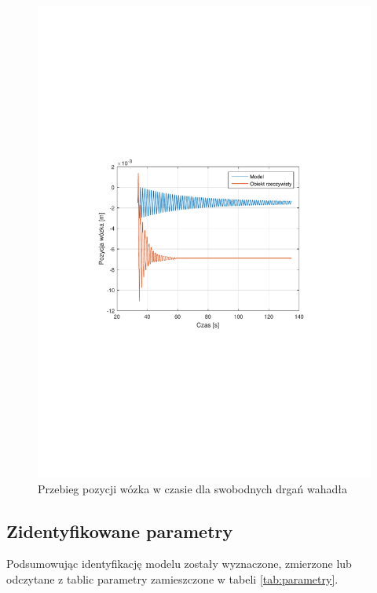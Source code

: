 \documentclass[12pt]{article}
\begin{document}
\begin{figure}[!htb]
    \begin{center}
        \includegraphics[width=16cm,trim=3cm 9cm 3cm 9cm,clip]
        {../res/img/idf1_wozek.pdf}
    \end{center}
    \caption{Przebieg pozycji wózka w czasie dla swobodnych drgań wahadła} 
    \label{rys:idf1_wozek}
\end{figure}

\subsection{Zidentyfikowane parametry}

Podsumowując identyfikację modelu zostały wyznaczone, zmierzone lub odczytane z
tablic parametry zamieszczone w tabeli \ref{tab:parametry}.
\end{document}
